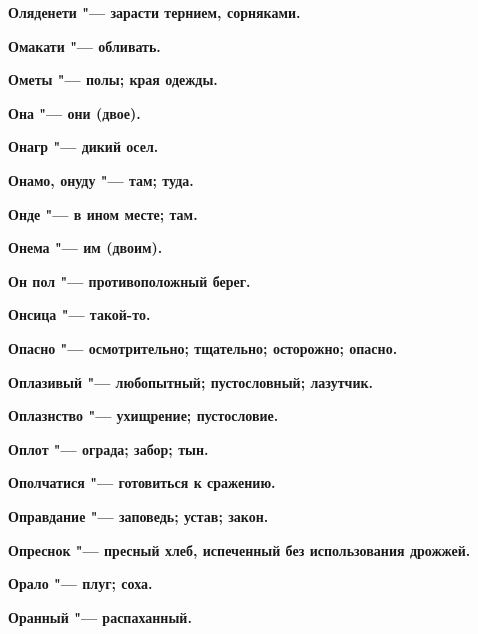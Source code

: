 \begin{mymulticols}{2}
\bfseries Оляденети\normalfont{} "--- зарасти тернием, сорняками. 




\bfseries Омакати\normalfont{} "--- обливать. 




\bfseries Ометы\normalfont{} "--- полы; края одежды. 




\bfseries Она\normalfont{} "--- они (двое). 




\bfseries Онагр\normalfont{} "--- дикий осел. 




\bfseries Онамо, онуду\normalfont{} "--- там; туда. 




\bfseries Онде\normalfont{} "--- в ином месте; там. 




\bfseries Онема\normalfont{} "--- им (двоим). 




\bfseries Он пол\normalfont{} "--- противоположный берег. 




\bfseries Онсица\normalfont{} "--- такой-то. 




\bfseries Опасно\normalfont{} "--- осмотрительно; тщательно; осторожно; опасно. 




\bfseries Оплазивый\normalfont{} "--- любопытный; пустословный; лазутчик. 




\bfseries Оплазнство\normalfont{} "--- ухищрение; пустословие. 




\bfseries Оплот\normalfont{} "--- ограда; забор; тын. 




\bfseries Ополчатися\normalfont{} "--- готовиться к сражению. 




\bfseries Оправдание\normalfont{} "--- заповедь; устав; закон. 




\bfseries Опреснок\normalfont{} "--- пресный хлеб, испеченный без использования дрожжей. 




\bfseries Орало\normalfont{} "--- плуг; соха. 




\bfseries Оранный\normalfont{} "--- распаханный. 





\end{mymulticols}
